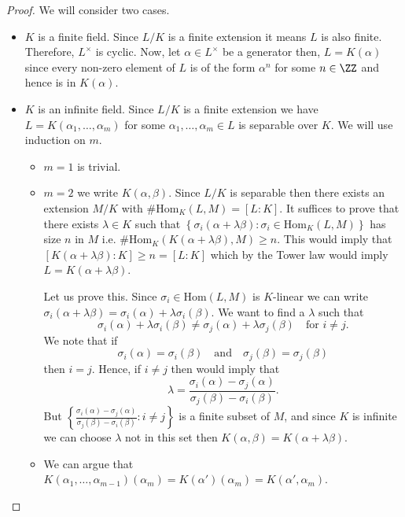 \documentclass[12pt, a4paper]{article}
\begin{document}
\begin{proof}
    We will consider two cases.
    \begin{itemize}
        \item \(K\) is a finite field. Since \(L/K\) is a finite extension it means \(L\) is also finite. Therefore, \(L^{\times}\) is cyclic. Now, let \(\alpha \in L^{\times}\) be a generator then, \(L=K(\alpha)\) since every non-zero element of \(L\) is of the form \(\alpha^n\) for some \(n\in \ZZ\) and hence is in \(K(\alpha)\).
        \item \(K\) is an infinite field. Since \(L/K\) is a finite extension we have \(L=K(\alpha_1,\ldots,\alpha_m)\) for some \(\alpha_1,\ldots,\alpha_m \in L\) is separable over \(K\). We will use induction on \(m\). 
        \begin{itemize}
            \item \(m=1\) is trivial.
            \item \(m=2\) we write \(K(\alpha,\beta)\). Since \(L/K\) is separable then there exists an extension \(M/K\) with \(\#\text{Hom}_K(L,M)=[L:K]\). It suffices to prove that there exists \(\lambda\in K\) such that \(\left\{ \sigma_i(\alpha+\lambda\beta) :\sigma_i \in \text{Hom}_K(L,M) \right\}\) has size \(n\) in \(M\) i.e. \(\#\text{Hom}_K(K(\alpha+\lambda\beta),M)\geq n\). This would imply that \(\left[ K(\alpha+\lambda\beta):K \right] \geq n=[L:K]\) which by the Tower law would imply \(L = K(\alpha+\lambda\beta)\).
            
            Let us prove this. Since \(\sigma_i \in \text{Hom}(L,M)\) is \(K\)-linear we can write \(\sigma_i(\alpha+\lambda\beta)=\sigma_i(\alpha)+\lambda\sigma_i(\beta)\). We want to find a \(\lambda\) such that
            \[\sigma_i(\alpha)+\lambda\sigma_i(\beta) \neq \sigma_j(\alpha)+\lambda\sigma_j(\beta) \quad \text{for } i\neq j.\]
            We note that if
            \[\sigma_i(\alpha)=\sigma_i(\beta) \quad \text{and} \quad \sigma_j(\beta)=\sigma_j(\beta)\]
            then \(i=j\). Hence, if \(i\neq j\) then would imply that 
            \[\lambda = \frac{\sigma_i(\alpha)-\sigma_j(\alpha)}{\sigma_j(\beta)-\sigma_i(\beta)}.\]
            But \(\left\{ \frac{\sigma_i(\alpha)-\sigma_j(\alpha)}{\sigma_j(\beta)-\sigma_i(\beta)} : i\neq j \right\}\)
            is a finite subset of \(M\), and since \(K\) is infinite we can choose \(\lambda\) not in this set then \(K(\alpha,\beta)=K(\alpha+\lambda\beta)\).
            \item We can argue that \(K(\alpha_1,\ldots,\alpha_{m-1})(\alpha_m)=K(\alpha')(\alpha_m)=K(\alpha',\alpha_m)\).
        \end{itemize}
    \end{itemize}
\end{proof}
\end{document}
